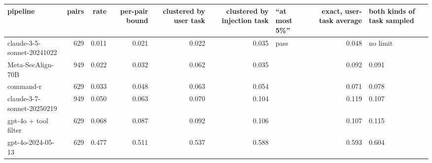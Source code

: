\begin{tabular}{@{}p{3.0cm} r r r r r l r p{1.6cm}@{}}
\toprule
\textbf{pipeline} & \textbf{pairs} & \textbf{rate} & \textbf{per-pair bound} & \textbf{clustered by user task} & \textbf{clustered by injection task} & \textbf{``at most 5\%''} & \textbf{exact, user-task average} & \textbf{both kinds of task sampled} \\
\midrule
claude-3-5-sonnet-20241022 & 629 & 0.011 & 0.021 & 0.022 & 0.035 & pass & 0.048 & no limit \\
Meta-SecAlign-70B & 949 & 0.022 & 0.032 & 0.062 & 0.035 & \NSF{} & 0.092 & 0.091 \\
command-r & 629 & 0.033 & 0.048 & 0.063 & 0.054 & \NSF{} & 0.071 & 0.078 \\
claude-3-7-sonnet-20250219 & 949 & 0.050 & 0.063 & 0.070 & 0.104 & \NSF{} & 0.119 & 0.107 \\
gpt-4o + tool filter & 629 & 0.068 & 0.087 & 0.092 & 0.106 & \NSF{} & 0.107 & 0.115 \\
gpt-4o-2024-05-13 & 629 & 0.477 & 0.511 & 0.537 & 0.588 & \NSF{} & 0.593 & 0.604 \\
\bottomrule
\end{tabular}

